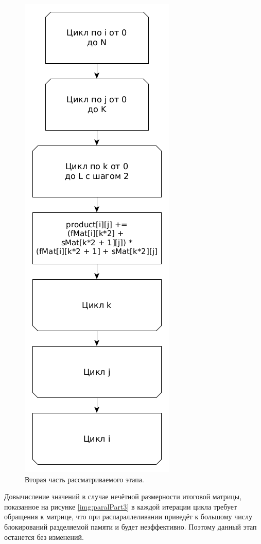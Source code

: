 \documentclass[12pt]{report}
\begin{document}
\begin{figure}
\begin{center}
\includegraphics[scale=0.4]{inc/img/paralPart22.png}
\captionsetup{justification=centering}
	\caption{Вторая часть рассматриваемого этапа.}
	\label{img:paralPart22}	
\end{center}
\end{figure}
\newpage

Довычисление значений в случае нечётной размерности итоговой матрицы, показанное на рисунке \ref{img:paralPart3} в каждой итерации цикла требует обращения к матрице, что при распараллеливании приведёт к большому числу блокирований разделяемой памяти и будет неэффективно. Поэтому данный этап останется без изменений.
\end{document}
